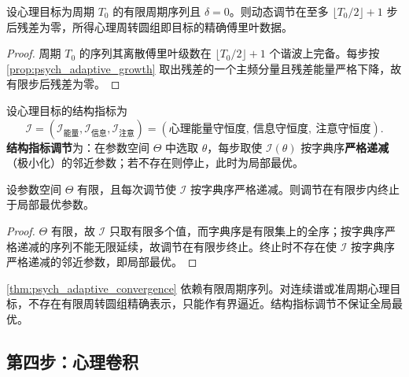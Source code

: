 \begin{theorem}[动态调节的收敛性]\label{thm:psych_adaptive_convergence}
设心理目标为周期 $T_0$ 的有限周期序列且 $\delta=0$。则动态调节在至多 $\lfloor T_0/2\rfloor+1$ 步后残差为零，所得心理周转圆组即目标的精确傅里叶数据。
\end{theorem}

\begin{proof}
周期 $T_0$ 的序列其离散傅里叶级数在 $\lfloor T_0/2\rfloor+1$ 个谐波上完备。每步按 \cref{prop:psych_adaptive_growth} 取出残差的一个主频分量且残差能量严格下降，故有限步后残差为零。
\end{proof}

\begin{definition}[结构指标调节]\label{def:psych_structure_metric_adjustment}
设心理目标的结构指标为
\[
\mathcal I=(\mathcal I_{\text{能量}},\mathcal I_{\text{信息}},\mathcal I_{\text{注意}})
=(\text{心理能量守恒度},\ \text{信息守恒度},\ \text{注意守恒度}).
\]
\textbf{结构指标调节}为：在参数空间 $\Theta$ 中选取 $\theta$，每步取使 $\mathcal I(\theta)$ 按字典序\textbf{严格递减}（极小化）的邻近参数；若不存在则停止，此时为局部最优。
\end{definition}

\begin{proposition}[结构指标调节的有限收敛]\label{prop:psych_structure_metric_convergence}
设参数空间 $\Theta$ 有限，且每次调节使 $\mathcal I$ 按字典序严格递减。则调节在有限步内终止于局部最优参数。
\end{proposition}

\begin{proof}
$\Theta$ 有限，故 $\mathcal I$ 只取有限多个值，而字典序是有限集上的全序；按字典序严格递减的序列不能无限延续，故调节在有限步终止。终止时不存在使 $\mathcal I$ 按字典序严格递减的邻近参数，即局部最优。
\end{proof}

\begin{remark}[动态调节的边界]\label{rem:psych_adaptive_boundary}
\cref{thm:psych_adaptive_convergence} 依赖有限周期序列。对连续谱或准周期心理目标，不存在有限周转圆组精确表示，只能作有界逼近。结构指标调节不保证全局最优。
\end{remark}

\subsection{第四步：心理卷积}

